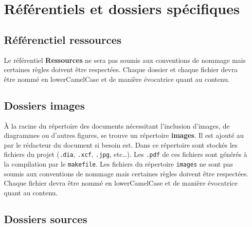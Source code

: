 
\section{Référentiels et dossiers spécifiques}

\subsection{Référenctiel ressources}

Le référentiel \textbf{Ressources} ne sera pas soumis aux conventions de nommage mais certaines règles doivent être respectées. Chaque dossier et chaque fichier devra être nommé en lowerCamelCase et de manière évocatrice quant au contenu. 

\subsection{Dossiers images}

\`{A} la racine du répertoire des documents nécessitant l'inclusion d'images, de diagrammes ou
d'autres figures, se trouve un répertoire \textbf{images}. Il est ajouté au \git{} par le
rédacteur du document si besoin est. Dans ce répertoire sont stockés les fichiers du projet
(\verb+.dia+, \verb+.xcf+, \verb+.jpg+, etc\dots). Les \verb+.pdf+ de ces fichiers sont générés
à la compilation par le \verb+makefile+.
Les fichiers du répertoire \verb+images+ ne sont pas soumis aux conventions de nommage mais certaines règles doivent être respectées. Chaque fichier devra être nommé en lowerCamelCase et de manière évocatrice quant au contenu. 

\subsection{Dossiers sources}

